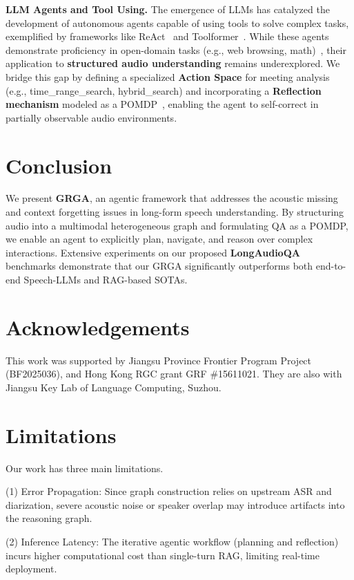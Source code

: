 \documentclass[11pt]{article}
\begin{document}
\textbf{LLM Agents and Tool Using.}
The emergence of LLMs has catalyzed the development of autonomous agents capable of using tools to solve complex tasks, exemplified by frameworks like ReAct~\cite{yao2022react} and Toolformer~\cite{schick2023toolformer}. While these agents demonstrate proficiency in open-domain tasks (e.g., web browsing, math)~\cite{nips/agentic-rag}, their application to \textbf{structured audio understanding} remains underexplored. We bridge this gap by defining a specialized \textbf{Action Space} for meeting analysis (e.g., time\_range\_search, hybrid\_search) and incorporating a \textbf{Reflection mechanism} modeled as a POMDP~\cite{pompd}, enabling the agent to self-correct in partially observable audio environments.

\section{Conclusion}
We present \textbf{GRGA}, an agentic framework that addresses the acoustic missing and context forgetting issues in long-form speech understanding. 
By structuring audio into a multimodal heterogeneous graph and formulating QA as a POMDP, we enable an agent to explicitly plan, navigate, and reason over complex interactions. 
Extensive experiments on our proposed \textbf{LongAudioQA} benchmarks demonstrate that our GRGA significantly outperforms both end-to-end Speech-LLMs and RAG-based SOTAs.

\section*{Acknowledgements}
This work was supported by Jiangsu Province Frontier Program Project (BF2025036), and Hong Kong RGC grant GRF \#15611021. They are also with Jiangsu Key Lab of Language Computing, Suzhou.

\section*{Limitations}
Our work has three main limitations. 

(1) Error Propagation: Since graph construction relies on upstream ASR and diarization, severe acoustic noise or speaker overlap may introduce artifacts into the reasoning graph. 

(2) Inference Latency: The iterative agentic workflow (planning and reflection) incurs higher computational cost than single-turn RAG, limiting real-time deployment. 
\end{document}
